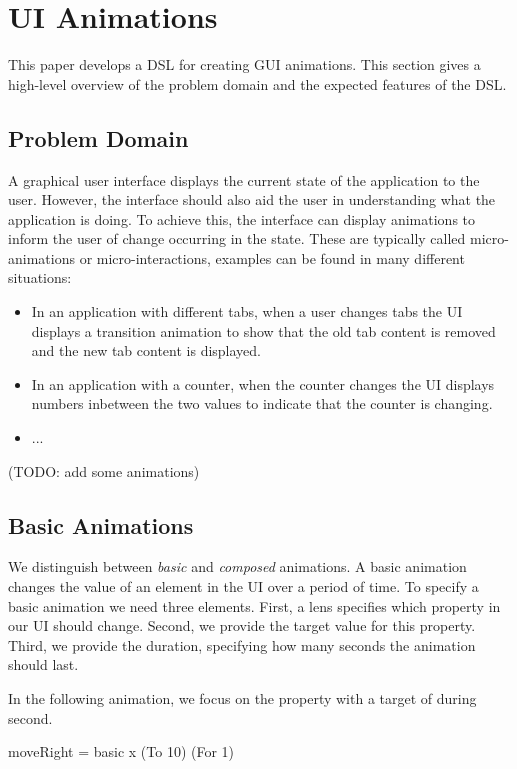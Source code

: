 \section{UI Animations}
\label{sec:ui_animations}

This paper develops a DSL for creating GUI animations. This section gives a high-level overview of the problem domain and the expected features of the DSL.

\subsection{Problem Domain}

A graphical user interface displays the current state of the application to the user. However, the interface should also aid the user in understanding what the application is doing. To achieve this, the interface can display animations to inform the user of change occurring in the state. These are typically called micro-animations or micro-interactions, examples can be found in many different situations:
\begin{itemize}
\item In an application with different tabs, when a user changes tabs the UI displays a transition animation to show that the old tab content is removed and the new tab content is displayed.
\item In an application with a counter, when the counter changes the UI displays numbers inbetween the two values to indicate that the counter is changing.
\item ...
\end{itemize}

(TODO: add some animations)

\subsection{Basic Animations}

We distinguish between \emph{basic} and \emph{composed} animations. A basic animation changes the value of an element in the UI over a period of time. To specify a basic animation we need three elements. First, a lens specifies which property in our UI should change. Second, we provide the target value for this property. Third, we provide the duration, specifying how many seconds the animation should last.

In the following  animation, we focus on the  property with a target of  during  second.
\begin{code}
moveRight = basic x (To 10) (For 1)
\end{code}

